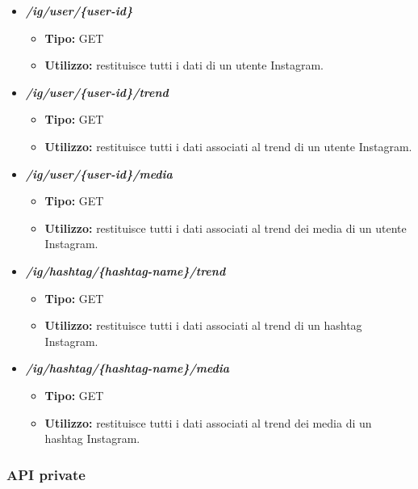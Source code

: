 \begin{itemize}
  \item \textit{\textbf{/ig/user/\{user-id\}}}
  \begin{itemize}
    \item \textbf{Tipo:} GET
    \item \textbf{Utilizzo:} restituisce tutti i dati di un utente Instagram.
  \end{itemize}
  \item \textit{\textbf{/ig/user/\{user-id\}/trend}}
  \begin{itemize}
    \item \textbf{Tipo:} GET
    \item \textbf{Utilizzo:} restituisce tutti i dati associati al trend di un utente Instagram.
  \end{itemize}
  \item \textit{\textbf{/ig/user/\{user-id\}/media}}
  \begin{itemize}
    \item \textbf{Tipo:} GET
    \item \textbf{Utilizzo:} restituisce tutti i dati associati al trend dei media di un utente Instagram.
  \end{itemize}
  \item \textit{\textbf{/ig/hashtag/\{hashtag-name\}/trend}}
  \begin{itemize}
    \item \textbf{Tipo:} GET
    \item \textbf{Utilizzo:} restituisce tutti i dati associati al trend di un hashtag Instagram.
  \end{itemize}
  \item \textit{\textbf{/ig/hashtag/\{hashtag-name\}/media}}
  \begin{itemize}
    \item \textbf{Tipo:} GET
    \item \textbf{Utilizzo:} restituisce tutti i dati associati al trend dei media di un hashtag Instagram.
  \end{itemize}

\end{itemize}

\subsubsection{API private}
\label{ssub:api_private}

